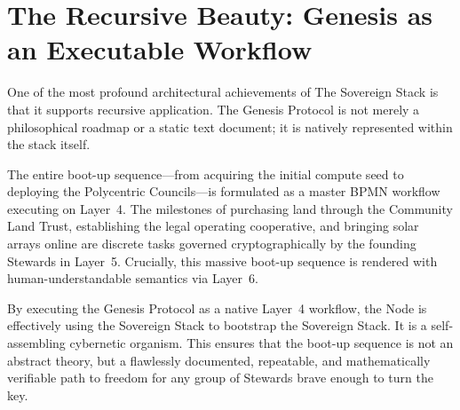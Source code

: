 \section{The Recursive Beauty: Genesis as an Executable Workflow}

One of the most profound architectural achievements of The Sovereign Stack is that it supports recursive application. The Genesis Protocol is not merely a philosophical roadmap or a static text document; it is natively represented within the stack itself.

The entire boot-up sequence---from acquiring the initial compute seed to deploying the Polycentric Councils---is formulated as a master BPMN workflow executing on Layer~4. The milestones of purchasing land through the Community Land Trust, establishing the legal operating cooperative, and bringing solar arrays online are discrete tasks governed cryptographically by the founding Stewards in Layer~5. Crucially, this massive boot-up sequence is rendered with human-understandable semantics via Layer~6. 

By executing the Genesis Protocol as a native Layer~4 workflow, the Node is effectively using the Sovereign Stack to bootstrap the Sovereign Stack. It is a self-assembling cybernetic organism. This ensures that the boot-up sequence is not an abstract theory, but a flawlessly documented, repeatable, and mathematically verifiable path to freedom for any group of Stewards brave enough to turn the key.
